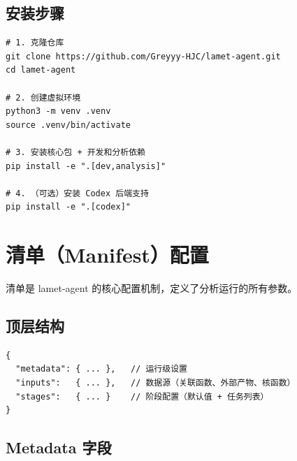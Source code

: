 \documentclass[12pt,a4paper]{ctexart}
\begin{document}
\subsection{安装步骤}

\begin{lstlisting}[style=bashcode]
# 1. 克隆仓库
git clone https://github.com/Greyyy-HJC/lamet-agent.git
cd lamet-agent

# 2. 创建虚拟环境
python3 -m venv .venv
source .venv/bin/activate

# 3. 安装核心包 + 开发和分析依赖
pip install -e ".[dev,analysis]"

# 4. （可选）安装 Codex 后端支持
pip install -e ".[codex]"
\end{lstlisting}

\section{清单（Manifest）配置}

清单是 lamet-agent 的核心配置机制，定义了分析运行的所有参数。

\subsection{顶层结构}

\begin{lstlisting}[style=jsoncode]
{
  "metadata": { ... },   // 运行级设置
  "inputs":   { ... },   // 数据源（关联函数、外部产物、核函数）
  "stages":   { ... }    // 阶段配置（默认值 + 任务列表）
}
\end{lstlisting}

\subsection{Metadata 字段}
\end{document}

